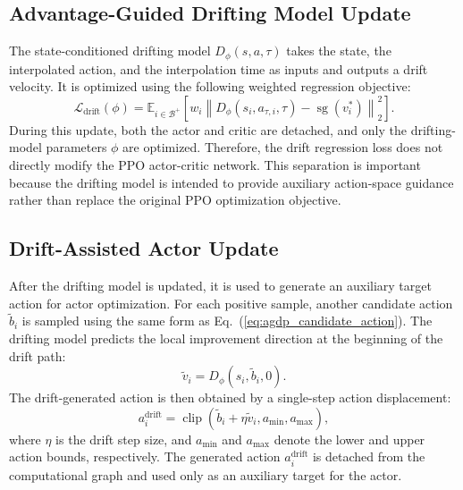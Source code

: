 \documentclass[conference]{IEEEtran}
\begin{document}
\subsection{Advantage-Guided Drifting Model Update}
\label{subsec:drift_model_update}

The state-conditioned drifting model $D_{\phi}(s,a,\tau)$ takes the state, the interpolated action, and the interpolation time as inputs and outputs a drift velocity. It is optimized using the following weighted regression objective:
\begin{equation}
\label{eq:agdp_drift_loss}
    \mathcal{L}_{\mathrm{drift}}(\phi)
    =
    \mathbb{E}_{i\in\mathcal{B}^{+}}
    \left[
    w_i
    \left\|
    D_{\phi}(s_i,a_{\tau,i},\tau)
    -
    \operatorname{sg}
    \left(
    v_i^{*}
    \right)
    \right\|_2^2
    \right].
\end{equation}
During this update, both the actor and critic are detached, and only the drifting-model parameters $\phi$ are optimized. Therefore, the drift regression loss does not directly modify the PPO actor-critic network. This separation is important because the drifting model is intended to provide auxiliary action-space guidance rather than replace the original PPO optimization objective.

\subsection{Drift-Assisted Actor Update}
\label{subsec:drift_actor_update}

After the drifting model is updated, it is used to generate an auxiliary target action for actor optimization. For each positive sample, another candidate action $\tilde{b}_i$ is sampled using the same form as Eq.~(\ref{eq:agdp_candidate_action}). The drifting model predicts the local improvement direction at the beginning of the drift path:
\begin{equation}
\label{eq:agdp_actor_drift_velocity}
    \tilde{v}_i
    =
    D_{\phi}(s_i,\tilde{b}_i,0).
\end{equation}
The drift-generated action is then obtained by a single-step action displacement:
\begin{equation}
\label{eq:agdp_drift_action}
    a_i^{\mathrm{drift}}
    =
    \operatorname{clip}
    \left(
    \tilde{b}_i
    +
    \eta \tilde{v}_i,
    a_{\min},
    a_{\max}
    \right),
\end{equation}
where $\eta$ is the drift step size, and $a_{\min}$ and $a_{\max}$ denote the lower and upper action bounds, respectively. The generated action $a_i^{\mathrm{drift}}$ is detached from the computational graph and used only as an auxiliary target for the actor.
\end{document}
